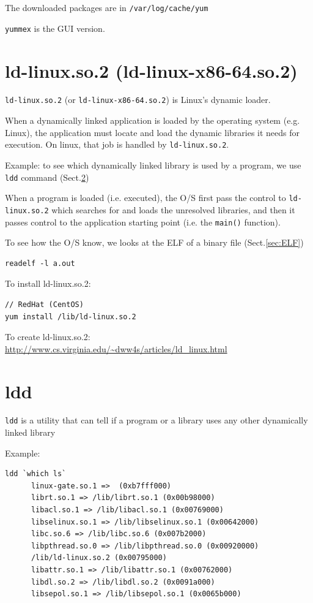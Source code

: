 The downloaded packages are in \verb!/var/log/cache/yum!

\verb!yummex! is the GUI version.

\section{ld-linux.so.2 (ld-linux-x86-64.so.2)}
\label{sec:ld-linux.so.2}

\verb!ld-linux.so.2! (or \verb!ld-linux-x86-64.so.2!) is Linux's dynamic loader.

When a dynamically linked application is loaded by the operating system (e.g.
Linux), the application must locate and load the dynamic libraries it needs for
execution. On linux, that job is handled by \verb!ld-linux.so.2!.

Example: to see which dynamically linked library is used by a program, we use
\verb!ldd! command (Sect.\ref{sec:ldd})

When a program is loaded (i.e. executed), the O/S first pass the control to
\verb!ld-linux.so.2! which searches for and loads the unresolved libraries,
and then it passes control to the application starting point (i.e. the
\verb!main()! function).

To see how the O/S know, we looks at the ELF of a binary file
(Sect.\ref{sec:ELF})
\begin{verbatim}
readelf -l a.out
\end{verbatim}

To install ld-linux.so.2:
\begin{verbatim}
// RedHat (CentOS)
yum install /lib/ld-linux.so.2
\end{verbatim}


To create ld-linux.so.2:
\url{http://www.cs.virginia.edu/~dww4s/articles/ld_linux.html}


\section{ldd}
\label{sec:ldd}

\verb!ldd! is a utility that can tell if a program or a library 
uses any other dynamically linked library

Example:
\begin{verbatim}
ldd `which ls`
      linux-gate.so.1 =>  (0xb7fff000)
      librt.so.1 => /lib/librt.so.1 (0x00b98000)
      libacl.so.1 => /lib/libacl.so.1 (0x00769000)
      libselinux.so.1 => /lib/libselinux.so.1 (0x00642000)
      libc.so.6 => /lib/libc.so.6 (0x007b2000)
      libpthread.so.0 => /lib/libpthread.so.0 (0x00920000)
      /lib/ld-linux.so.2 (0x00795000)
      libattr.so.1 => /lib/libattr.so.1 (0x00762000)
      libdl.so.2 => /lib/libdl.so.2 (0x0091a000)
      libsepol.so.1 => /lib/libsepol.so.1 (0x0065b000)
\end{verbatim}

